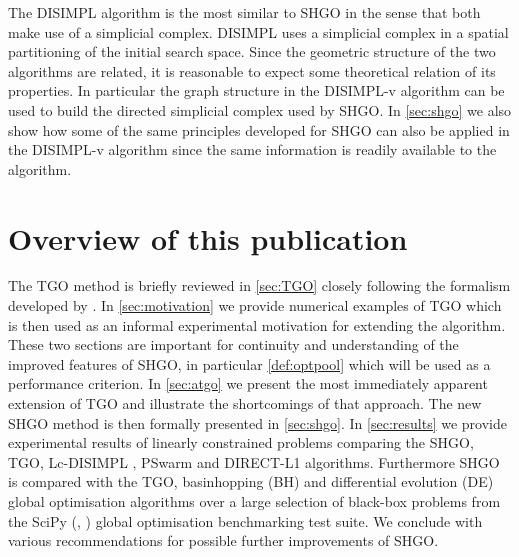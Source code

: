 The DISIMPL algorithm is the most similar to SHGO in the sense that both make use of a simplicial complex. DISIMPL uses a simplicial complex in a  spatial partitioning of the initial search space. Since the geometric structure of the two algorithms are related, it is reasonable to expect some theoretical relation of its properties. In particular the graph structure in the DISIMPL-v algorithm \cite{Paul2016} can be used to build the directed simplicial complex used by SHGO. In \autoref{sec:shgo} we also show how some of the same principles developed for SHGO can also be applied in the DISIMPL-v algorithm since the same information is readily available to the algorithm.
 
\section{Overview of this publication}
The TGO method is briefly reviewed in \autoref{sec:TGO} closely following the formalism developed by \citet{Henderson2015}. In \autoref{sec:motivation} we provide numerical examples of TGO which is then used as an informal experimental motivation for extending the algorithm. These two sections are important for continuity and understanding of the improved features of SHGO, in particular \autoref{def:optpool} which will be used as a performance criterion. In \autoref{sec:atgo} we present the most immediately apparent extension of TGO and illustrate the shortcomings of that approach. The new SHGO method is then formally presented in \autoref{sec:shgo}. In \autoref{sec:results} we provide experimental results of linearly constrained problems comparing the SHGO, TGO, Lc-DISIMPL \cite{Paul2016}, PSwarm \cite{Vaz2008} and DIRECT-L1 \cite{finkel2003direct} algorithms. Furthermore SHGO is compared with the TGO, basinhopping (BH) and differential evolution (DE) global optimisation algorithms over a large selection of black-box problems from the SciPy (\citeauthor*{scipy}, \citeyear{scipy}) global optimisation benchmarking test suite. We conclude with various recommendations for possible further improvements of SHGO.